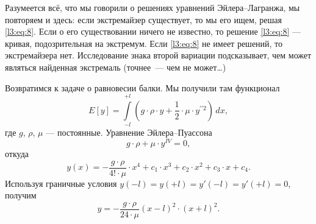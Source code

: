 Разумеется всё, что мы говорили о решениях уравнений Эйлера--Лагранжа, мы повторяем и здесь: если экстремайзер существует, то мы его ищем, решая \eqref{l3:eq:8}. Если о его существовании ничего не известно, то решение \eqref{l3:eq:8} --- кривая, подозрительная на экстремум. Если \eqref{l3:eq:8} не имеет решений, то экстремайзера нет. Исследование знака второй вариации подсказывает, чем может являться найденная экстремаль (точнее~--- чем не может{\mb\dots\!})

Возвратимся к задаче о равновесии балки. Мы получили там функционал 
\begin{equation*}
	 E[y]=\int\limits_{-l}^{+l}\left(g\cdot\rho\cdot y+\frac12\cdot\mu\cdot y^{\prime\prime2}\right)\,dx,
\end{equation*}
где $g$, $\rho$, $\mu$ --- постоянные.
Уравнение Эйлера--Пуассона 
\begin{equation*}
	 g\cdot\rho+\mu\cdot y^{IV}=0,
\end{equation*}
откуда
\begin{equation*}
	 y(x)=-\frac{g\cdot\rho}{4!\cdot\mu}\cdot x^4+c_1\cdot x^3+c_2\cdot x^2+c_3\cdot x+c_4.
\end{equation*}
Используя граничные условия $y(-l)=y(+l)=y'(-l)=y'(+l)=0${\mb,} получим
\begin{equation*}
	 y=-\frac{g\cdot\rho}{24\cdot\mu}(x-l)^2\cdot(x+l)^2.
\end{equation*} 

